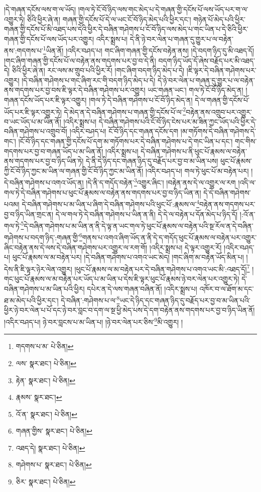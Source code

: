 །དེ་གཞན་དངོས་ལས་ག་ལ་ཡོད། །གལ་ཏེ་ངོ་བོ་ཉིད་ལས་གང་མེད་པ་དེ་གཞན་གྱི་དངོས་པོ་ལས་ཡོད་པར་ག་ལ་འགྱུར་ཏེ། ཅིའི་ཕྱིར་ཞེ་ན། གཞན་གྱི་དངོས་པོ་དེ་ལ་ཡང་ངོ་བོ་ཉིད་མེད་པའི་ཕྱིར་དང་། གཉེན་པོ་མེད་པའི་ཕྱིར་གཞན་གྱི་དངོས་པོ་མི་འཐད་པས་དེའི་ཕྱིར་དེ་བཞིན་གཤེགས་པ་ངོ་བོ་ཉིད་ལས་མེད་པ་གང་ཡིན་པ་དེ་ཅིའི་ཕྱིར་གཞན་གྱི་དངོས་པོ་ལས་ཡོད་པར་འགྱུར། འདིར་སྨྲས་པ། དེ་ནི་ཉེ་བར་ལེན་པ་གཞན་དུ་གྱུར་པ་ལ་བརྟེན་ནས་:གདགས་པ་\footnote{གདགས་པ་མ་  པེ་ཅིན། }ཡིན་ནོ། །འདིར་བཤད་པ། གང་ཞིག་གཞན་གྱི་དངོས་བརྟེན་ནས། །དེ་བདག་ཉིད་དུ་མི་འཐད་དོ། །གང་ཞིག་གཞན་གྱི་དངོས་པོ་ལ་བརྟེན་ནས་གདགས་པར་བྱ་བ་དེ་ནི། བདག་ཉིད་ཡོད་དོ་ཞེས་བརྗོད་པར་མི་འཐད་དེ། ཅིའི་ཕྱིར་ཞེ་ན། རང་ལས་མ་གྲུབ་པའི་ཕྱིར་རོ། །གང་ཞིག་བདག་ཉིད་མེད་པ་དེ། །ཇི་ལྟར་དེ་བཞིན་གཤེགས་པར་འགྱུར། །དེ་བཞིན་གཤེགས་པ་གང་ཞིག་རང་གི་བདག་ཉིད་མེད་པ་དེ། དེ་ཉེ་བར་ལེན་པ་གཞན་དུ་གྱུར་པ་ལ་བརྟེན་ནས་གདགས་པར་བྱ་བས་ཇི་ལྟར་དེ་བཞིན་གཤེགས་པར་འགྱུར། ཡང་གཞན་ཡང་། གལ་ཏེ་ངོ་བོ་ཉིད་མེད་ན། །གཞན་དངོས་ཡོད་པར་ཇི་ལྟར་འགྱུར། །གལ་ཏེ་དེ་བཞིན་གཤེགས་པ་ངོ་བོ་ཉིད་མེད་ན། དེ་ལ་གཞན་གྱི་དངོས་པོ་ཡོད་པར་ཇི་ལྟར་འགྱུར་ཏེ། དེ་མེད་ན་དེ་བཞིན་གཤེགས་པ་གཞན་གྱི་དངོས་པོ་ལ་\footnote{ལས་  སྣར་ཐང་།  པེ་ཅིན། }བརྟེན་ནས་འགྲུབ་པར་འགྱུར་བ་ཡང་ཡོད་པ་མ་ཡིན་ནོ། །འདིར་སྨྲས་པ། དེ་བཞིན་གཤེགས་པའི་ངོ་བོ་ཉིད་ངེས་པར་མ་ཟིན་ཀྱང་ཡོད་པའི་ཕྱིར་དེ་བཞིན་གཤེགས་པ་འགྲུབ་བོ། །འདིར་བཤད་པ། ངོ་བོ་ཉིད་དང་གཞན་དངོས་དག །མ་གཏོགས་དེ་བཞིན་གཤེགས་དེ་གང་། །ངོ་བོ་ཉིད་དང་གཞན་གྱི་དངོས་པོ་དག་མ་གཏོགས་པར་དེ་བཞིན་གཤེགས་པ་དེ་གང་ཡིན་པ་དང་། གང་གིས་གདགས་པར་བྱ་བ་གཞན་ཡོད་པ་མ་ཡིན་ནོ། །འདིར་སྨྲས་པ། དེ་བཞིན་གཤེགས་པ་ནི་ཕུང་པོ་རྣམས་ལ་བརྟེན་ནས་གདགས་པར་བྱ་བ་ཉིད་ཡིན་ཏེ། དེ་ནི་དེ་ཉིད་དང་གཞན་ཉིད་དུ་བརྗོད་པར་བྱ་བ་མ་ཡིན་པས། ཕུང་པོ་རྣམས་ཀྱི་ངོ་བོ་ཉིད་ཀྱང་མ་ཡིན་ལ་གཞན་གྱི་ངོ་བོ་ཉིད་ཀྱང་མ་ཡིན་ནོ། །འདིར་བཤད་པ། གལ་ཏེ་ཕུང་པོ་མ་བརྟེན་པར། །དེ་བཞིན་གཤེགས་པ་འགའ་ཡོད་ན། །དེ་ནི་ད་གདོད་བརྟེན་\footnote{རྟེན་  སྣར་ཐང་།  པེ་ཅིན། }འགྱུར་ཞིང་། །བརྟེན་ནས་དེ་ལ་འགྱུར་ལ་རག །འདི་ལ་གལ་ཏེ་དེ་བཞིན་གཤེགས་པ་ཕུང་པོ་རྣམས་ལ་བརྟེན་ནས་གདགས་པར་བྱ་བ་ཉིད་ཡིན་ན། དེ་དེ་བཞིན་གཤེགས་པའམ། དེ་བཞིན་གཤེགས་པ་མ་ཡིན་པ་ཞིག་དེ་བཞིན་གཤེགས་པའི་ཕུང་པོ་:རྣམས་ལ་\footnote{རྣམས་  སྣར་ཐང་། }བརྟེན་ནས་གདགས་པར་བྱ་བ་ཉིད་ཡིན་གྲང་ན། དེ་ལ་གལ་ཏེ་དེ་བཞིན་གཤེགས་པ་ཡིན་ན་ནི། དེ་དེ་ལ་བརྟེན་པ་དོན་མེད་པ་ཉིད་དོ། །:འོ་ན་གལ་ཏེ་\footnote{འོ་ན་  སྣར་ཐང་།  པེ་ཅིན། }དེ་བཞིན་གཤེགས་པ་མ་ཡིན་ན་ནི་དེ་ལྟ་ན་ཡང་གལ་ཏེ་ཕུང་པོ་རྣམས་ལ་བརྟེན་པའི་སྔ་རོལ་ན་དེ་བཞིན་གཤེགས་པ་བདག་ཉིད་:གཞན་གྱི་\footnote{གཞན་གྱིས་  སྣར་ཐང་།  པེ་ཅིན། }གནས་པ་འགའ་ཞིག་ཡོད་ན་ནི་དེ་ད་གདོད་ཕུང་པོ་རྣམས་ལ་བརྟེན་པར་འགྱུར་ཞིང་བརྟེན་ནས་དེ་ལས་དེ་བཞིན་གཤེགས་པར་འགྱུར་ལ་རག་གོ། །འདིར་སྨྲས་པ། དེ་ལྟར་འགྱུར་རོ། །འདིར་བཤད་པ། ཕུང་པོ་རྣམས་ལ་མ་བརྟེན་པར། །དེ་བཞིན་གཤེགས་པ་འགའ་ཡང་མེད། །གང་ཞིག་མ་བརྟེན་ཡོད་མིན་པ། །དེས་ནི་ཇི་ལྟར་ཉེར་ལེན་འགྱུར། །ཕུང་པོ་རྣམས་ལ་མ་བརྟེན་པར་དེ་བཞིན་གཤེགས་པ་འགའ་ཡང་མི་:འཐད་དོ།\footnote{འཐད་དེ།  སྣར་ཐང་།  པེ་ཅིན། } །གང་ཕུང་པོ་རྣམས་ལ་མ་བརྟེན་པར་ཡོད་པ་མ་ཡིན་པ་དེས་ཇི་ལྟར་ཕུང་པོ་རྣམས་ཉེ་བར་ལེན་པར་འགྱུར་ཏེ། དེ་བཞིན་གཤེགས་པ་མ་ཡིན་པའི་ཕྱིར། དཔེར་ན་དེ་ལས་གཞན་བཞིན་ནོ། །འདིར་སྨྲས་པ། འཁོར་བ་ལ་ཐོག་མ་དང་ཐ་མ་མེད་པའི་ཕྱིར་དང་། དེ་བཞིན་:གཤེགས་པ་ལ་\footnote{གཤེགས་པ་  སྣར་ཐང་།  པེ་ཅིན། }ཡང་དེ་ཉིད་དང་གཞན་ཉིད་དུ་བརྗོད་པར་བྱ་བ་མ་ཡིན་པའི་ཕྱིར་ཉེ་བར་ལེན་པ་པོ་དང་ཉེ་བར་བླང་བ་དག་ལ་སྔ་ཕྱི་མེད་པས་དེ་དག་བརྟེན་ནས་གདགས་པར་བྱ་བ་ཉིད་ཡིན་ནོ། །འདིར་བཤད་པ། ཉེ་བར་བླངས་པ་མ་ཡིན་པ། །ཉེ་བར་ལེན་པར་ཅིས་\footnote{ཅིར་  སྣར་ཐང་།  པེ་ཅིན། }མི་འགྱུར། །
